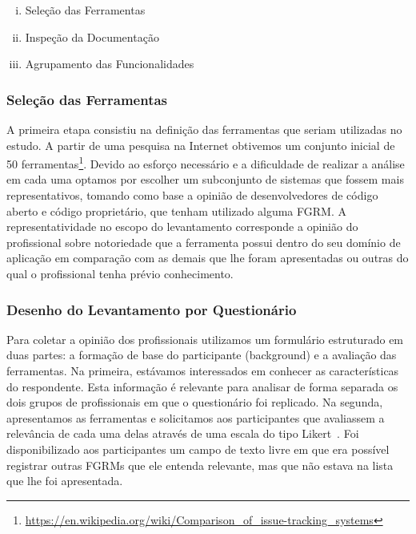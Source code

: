 \begin{enumerate}[(i)]
	\item Seleção das Ferramentas
	\item Inspeção da Documentação
	\item Agrupamento das Funcionalidades
\end{enumerate}

\subsubsection{Seleção das Ferramentas}
\label{subsubsec:selecao-ferramentas}

A primeira etapa consistiu na definição das ferramentas que seriam utilizadas
no estudo. A partir de uma pesquisa na Internet obtivemos um conjunto inicial
de 50
ferramentas\footnote{\url{https://en.wikipedia.org/wiki/Comparison_of_issue-tracking_systems}}.
Devido ao esforço necessário e a dificuldade de realizar a análise em cada uma
optamos por escolher um subconjunto de sistemas que fossem mais
representativos, tomando como base a opinião de desenvolvedores de código
aberto e código proprietário, que tenham utilizado alguma FGRM\@. A
representatividade no escopo do levantamento corresponde a opinião do
profissional sobre notoriedade que a ferramenta possui dentro do seu domínio de
aplicação em comparação com as demais que lhe foram apresentadas ou outras do
qual o profissional tenha prévio conhecimento.

\subsubsection{Desenho do Levantamento por Questionário}
\label{ssub:metodologia_desenho_da_pesquisa_com_profissionais}

Para coletar a opinião dos profissionais utilizamos um formulário estruturado em
duas partes: a formação de base do participante (background) e a avaliação das
ferramentas. Na primeira, estávamos interessados em conhecer as características
do respondente. Esta informação é relevante para analisar de forma separada os
dois grupos de profissionais em que o questionário foi replicado. Na segunda,
apresentamos as ferramentas e solicitamos aos participantes que avaliassem a
relevância de cada uma delas através de uma escala do tipo
Likert~\cite{robbins2011plotting}. Foi disponibilizado aos participantes um
campo de texto livre em que era possível registrar outras FGRMs que ele entenda
relevante, mas que não estava na lista que lhe foi apresentada.

